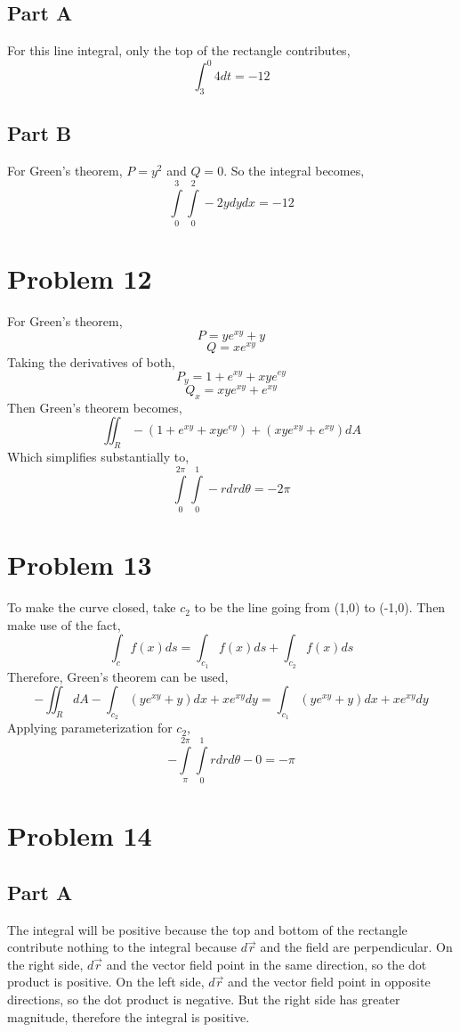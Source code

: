 \documentclass{article}
\begin{document}
\subsection*{Part A}

For this line integral, only the top of the rectangle contributes,
$$ \int_3^0 4 dt = -12 $$

\subsection*{Part B}

For Green's theorem, $P = y^2$ and $Q = 0$. So the integral becomes,
$$ \int\limits_0^3\int\limits_0^2 -2 y dy dx = -12 $$

\section*{Problem 12}

For Green's theorem,
$$ P = y e^{xy} + y $$
$$ Q = x e^{xy} $$
Taking the derivatives of both,
$$ P_y = 1 + e^{xy} + xy e^{ey} $$
$$ Q_x = xy e^{xy} + e^{xy} $$
Then Green's theorem becomes,
$$\iint_R -(1 + e^{xy} + xy e^{ey}) + (xy e^{xy} + e^{xy}) dA $$
Which simplifies substantially to,
$$ \int\limits_0^{2\pi}\int\limits_0^1 -r dr d\theta  = -2\pi $$

\section*{Problem 13}

To make the curve closed, take $c_2$ to be the line going from (1,0) to (-1,0).
Then make use of the fact,
$$ \int_c f(x) ds = \int_{c_1} f(x) ds + \int_{c_2} f(x) ds $$
Therefore, Green's theorem can be used,
$$ -\iint_R dA - \int_{c_2} (y e^{xy} + y)dx + x e^{xy} dy = \int_{c_1} (y
e^{xy} + y)dx + x e^{xy} dy$$
Applying parameterization for $c_2$,
$$ -\int\limits_{\pi}^{2\pi}\int\limits_0^1 r dr d\theta - 0 = -\pi $$

\section*{Problem 14}

\subsection*{Part A}

The integral will be positive because the top and bottom of the rectangle
contribute nothing to the integral because $d\vec{r}$ and the field are
perpendicular. On the right side, $d\vec{r}$ and the vector field point in the
same direction, so the dot product is positive. On the left side, $d\vec{r}$ and
the vector field point in opposite directions, so the dot product is negative.
But the right side has greater magnitude, therefore the integral is positive.
\end{document}
